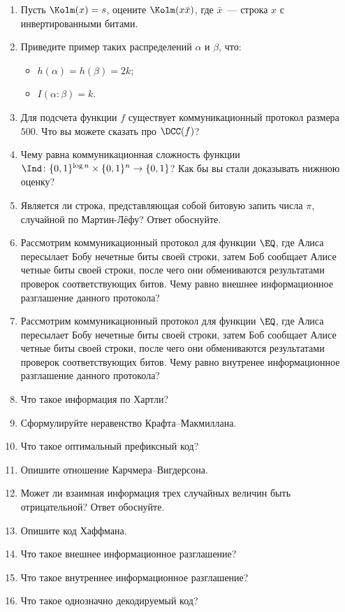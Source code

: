 





\begin{enumerate}
    \item Пусть $\Kolm(x) = s$, оцените $\Kolm(x \bar{x})$, где $\bar{x}$~--- строка $x$ с
        инвертированными битами.
    \item Приведите пример таких распределений $\alpha$ и $\beta$, что:
        \begin{itemize}
            \item $h(\alpha) = h(\beta) = 2k$;
            \item $I(\alpha : \beta) = k$.                
        \end{itemize}
    \item Для подсчета функции $f$ существует коммуникационный протокол размера $500$. Что вы можете
        сказать про $\DCC(f)$?
    \item Чему равна коммуникационная сложность функции $\Ind\colon \{0, 1\}^{\log n} \times \{0, 1\}^{n}
        \to \{0, 1\}$? Как бы вы стали доказывать нижнюю оценку?
    \item Является ли строка, представляющая собой битовую запить числа $\pi$, случайной по Мартин-Лёфу?
        Ответ обоснуйте.
    \item Рассмотрим коммуникационный протокол для функции $\EQ$, где Алиса пересылает Бобу нечетные биты
        своей строки, затем Боб сообщает Алисе четные биты своей строки, после чего они обмениваются
        результатами проверок соответствующих битов. Чему равно внешнее информационное разглашение
        данного протокола?
    \item Рассмотрим коммуникационный протокол для функции $\EQ$, где Алиса пересылает Бобу нечетные биты
        своей строки, затем Боб сообщает Алисе четные биты своей строки, после чего они обмениваются
        результатами проверок соответствующих битов. Чему равно внутренее информационное разглашение
        данного протокола?
        
    \item Что такое информация по Хартли?
    \item Сформулируйте неравенство Крафта--Макмиллана.
    \item Что такое оптимальный префиксный код?
    \item Опишите отношение Карчмера--Вигдерсона.

    \item Может ли взаимная информация трех случайных величин быть отрицательной? Ответ обоснуйте.
    \item Опишите код Хаффмана.        
    \item Что такое внешнее информационное разглашение?
    \item Что такое внутреннее информационное разглашение?

    \item Что такое однозначно декодируемый код?
\end{enumerate}



